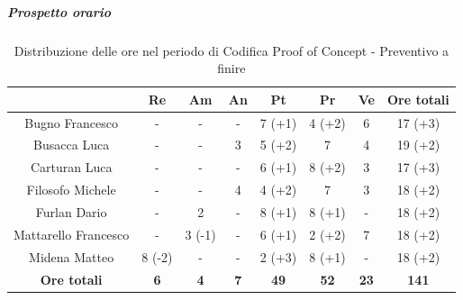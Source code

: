 \subparagraph{Prospetto orario} \label{subparagraph:prospetto_orario_PoC}
\begin{table}[H]
  \centering
  \renewcommand{\arraystretch}{1.8}
  \begin{tabular}{c|c|c|c|c|c|c|c}
    \rowcolor[HTML]{125E28}
    \multicolumn{1}{c}{\color[HTML]{FFFFFF}\textbf{ Nominativo }}
                         & \multicolumn{1}{c}{\color[HTML]{FFFFFF}\textbf{ Re }}
                         & \multicolumn{1}{c}{\color[HTML]{FFFFFF}\textbf{ Am}}
                         & \multicolumn{1}{c}{\color[HTML]{FFFFFF}\textbf{ An }}
                         & \multicolumn{1}{c}{\color[HTML]{FFFFFF}\textbf{ Pt }}
                         & \multicolumn{1}{c}{\color[HTML]{FFFFFF}\textbf{ Pr }}
                         & \multicolumn{1}{c}{\color[HTML]{FFFFFF}\textbf{ Ve }}
                         & \multicolumn{1}{c}{\color[HTML]{FFFFFF}\textbf{ Ore totali }}                                                                                    \\
    \hline
    Bugno Francesco      & -                                                             & -          & -          & 7 (+1)      & 4 (+2)      & 6           & 17 (+3)      \\
    Busacca Luca         & -                                                             & -          & 3          & 5 (+2)      & 7           & 4           & 19 (+2)      \\
    Carturan Luca        & -                                                             & -          & -          & 6 (+1)      & 8 (+2)      & 3           & 17 (+3)      \\
    Filosofo Michele     & -                                                             & -          & 4          & 4 (+2)      & 7           & 3           & 18 (+2)      \\
    Furlan Dario         & -                                                             & 2          & -          & 8 (+1)      & 8 (+1)      & -           & 18 (+2)      \\
    Mattarello Francesco & -                                                             & 3 (-1)     & -          & 6 (+1)      & 2 (+2)      & 7           & 18 (+2)      \\
    Midena Matteo        & 8 (-2)                                                        & -          & -          & 2 (+3)      & 8 (+1)      & -           & 18 (+2)      \\
    \textbf{Ore totali}  & \textbf{6}                                                    & \textbf{4} & \textbf{7} & \textbf{49} & \textbf{52} & \textbf{23} & \textbf{141}
  \end{tabular}
  \caption{Distribuzione delle ore nel periodo di Codifica Proof of Concept\glo{} - Preventivo a finire}
\end{table}

